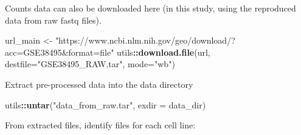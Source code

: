 \documentclass[]{article}
\newenvironment{Shaded}{\begin{snugshade}}{\end{snugshade}}
\newcommand{\KeywordTok}[1]{\textcolor[rgb]{0.13,0.29,0.53}{\textbf{#1}}}
\newcommand{\DataTypeTok}[1]{\textcolor[rgb]{0.13,0.29,0.53}{#1}}
\newcommand{\StringTok}[1]{\textcolor[rgb]{0.31,0.60,0.02}{#1}}
\newcommand{\OperatorTok}[1]{\textcolor[rgb]{0.81,0.36,0.00}{\textbf{#1}}}
\newcommand{\NormalTok}[1]{#1}
\begin{document}
Counts data can also be downloaded here (in this study, using the
reproduced data from raw fastq files).

\begin{Shaded}
\begin{Highlighting}[]
\NormalTok{url_main <-}\StringTok{ "https://www.ncbi.nlm.nih.gov/geo/download/?acc=GSE38495&format=file"}
\NormalTok{utils}\OperatorTok{::}\KeywordTok{download.file}\NormalTok{(url, }\DataTypeTok{destfile=}\StringTok{"GSE38495_RAW.tar"}\NormalTok{, }\DataTypeTok{mode=}\StringTok{"wb"}\NormalTok{) }
\end{Highlighting}
\end{Shaded}

Extract pre-processed data into the data directory

\begin{Shaded}
\begin{Highlighting}[]
\NormalTok{utils}\OperatorTok{::}\KeywordTok{untar}\NormalTok{(}\StringTok{"data_from_raw.tar"}\NormalTok{, }\DataTypeTok{exdir =}\NormalTok{ data_dir)}
\end{Highlighting}
\end{Shaded}

From extracted files, identify files for each cell line:
\end{document}
